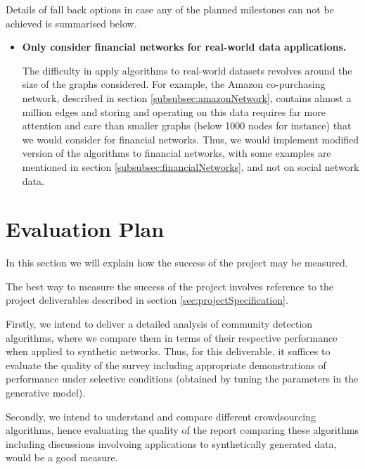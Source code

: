 \documentclass[12pt]{article}
\numberwithin{equation}{section}
\begin{document}
Details of fall back options in case any of the planned milestones can not be achieved is summarised below.
\begin{itemize}
	\item \textbf{Only consider financial networks for real-world data applications.}

	The difficulty in apply algorithms to real-world datasets revolves around the size of the graphs considered. For example, the Amazon co-purchasing network, described in section \ref{subsubsec:amazonNetwork}, contains almost a million edges and storing and operating on this data requires far more attention and care than smaller graphs (below 1000 nodes for instance) that we would consider for financial networks. Thus, we would implement modified version of the algorithms to financial networks, with some examples are mentioned in section \ref{subsubsec:financialNetworks}, and not on social network data.
\end{itemize}


\newpage
\thispagestyle{plain}
\mbox{}
\section {Evaluation Plan}
\label{sec:evaluationPlan}

In this section we will explain how the success of the project may be measured.

The best way to measure the success of the project involves reference to the project deliverables described in section \ref{sec:projectSpecification}.

Firstly, we intend to deliver a detailed analysis of community detection algorithms, where we compare them in terms of their respective performance when applied to synthetic networks. Thus, for this deliverable, it suffices to evaluate the quality of the survey including appropriate demonstrations of performance under selective conditions (obtained by tuning the parameters in the generative model).

Secondly, we intend to understand and compare different crowdsourcing algorithms, hence evaluating the quality of the report comparing these algorithms including discussions involvoing applications to synthetically generated data, would be a good measure.
\end{document}
